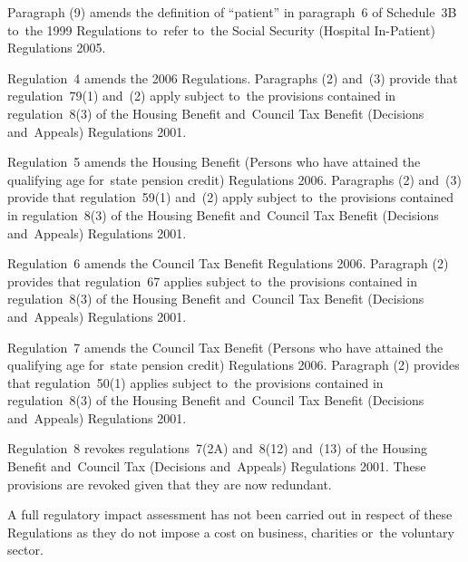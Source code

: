 \documentclass[12pt,a4paper]{article}
\begin{document}
Paragraph (9) amends the definition of “patient” in paragraph~6 of Schedule~3B to~the 1999 Regulations to~refer to~the Social Security (Hospital In-Patient) Regulations 2005.

Regulation~4 amends the 2006 Regulations. Paragraphs (2) and~(3) provide that regulation~79(1) and~(2) apply subject to~the provisions contained in regulation~8(3) of the Housing Benefit and~Council Tax Benefit (Decisions and~Appeals) Regulations 2001.

Regulation~5 amends the Housing Benefit (Persons who have attained the qualifying age for~state pension credit) Regulations 2006. Paragraphs (2) and~(3) provide that regulation~59(1) and~(2) apply subject to~the provisions contained in regulation~8(3) of the Housing Benefit and~Council Tax Benefit (Decisions and~Appeals) Regulations 2001.

Regulation~6 amends the Council Tax Benefit Regulations 2006. Paragraph (2) provides that regulation~67 applies subject to~the provisions contained in regulation~8(3) of the Housing Benefit and~Council Tax Benefit (Decisions and~Appeals) Regulations 2001.

Regulation~7 amends the Council Tax Benefit (Persons who have attained the qualifying age for~state pension credit) Regulations 2006. Paragraph (2) provides that regulation~50(1) applies subject to~the provisions contained in regulation~8(3) of the Housing Benefit and~Council Tax Benefit (Decisions and~Appeals) Regulations 2001.

Regulation~8 revokes regulations~7(2A) and~8(12) and~(13) of the Housing Benefit and~Council Tax (Decisions and~Appeals) Regulations 2001. These provisions are revoked given that they are now redundant.

A full regulatory impact assessment has not been carried out in respect of these Regulations as they do not impose a cost on business, charities or~the voluntary sector. 
\end{document}
